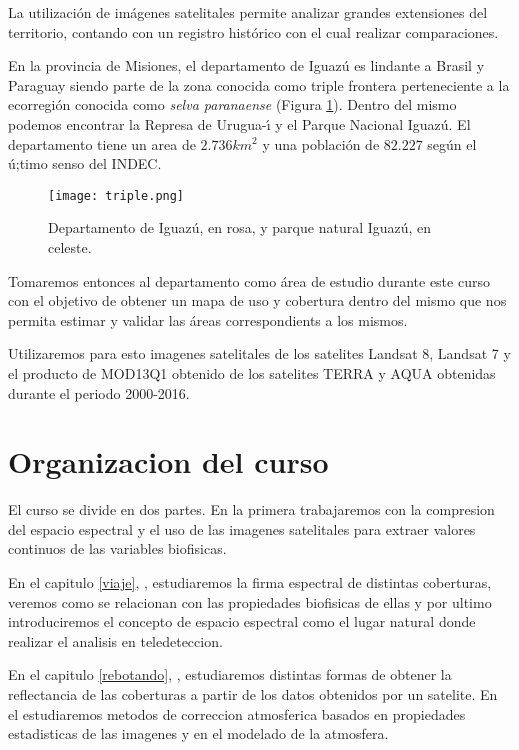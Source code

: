 \label{sec:intro}

La utilización de imágenes satelitales permite analizar grandes extensiones del
territorio, contando con un registro histórico con el cual realizar
comparaciones.

En la provincia de Misiones, el departamento de Iguaz\'u es lindante a Brasil y
Paraguay siendo parte de la zona conocida como triple frontera
perteneciente a la ecorregi\'on conocida como \emph{selva paranaense} (Figura \ref{parque}). Dentro
del mismo podemos encontrar la Represa de Urugua-\'{\i} y el Parque Nacional
Iguaz\'u. El departamento tiene un area de $2.736 km^2$ y una poblaci\'on de
$82.227$ seg\'un el \'u;timo senso del INDEC.

\begin{figure}[h!]
  \centering
  \texttt{[image: triple.png]}
  \caption{Departamento de Iguaz\'u, en rosa, y parque natural Iguaz\'u, en celeste.}
  \label{parque}
\end{figure}

Tomaremos entonces al departamento como \'area de estudio durante este curso
con el objetivo de obtener un mapa de uso y cobertura dentro del mismo que nos
permita estimar y validar  las \'areas correspondients a los mismos.

Utilizaremos para esto imagenes satelitales de los satelites Landsat 8, Landsat 7 y
el producto de MOD13Q1 obtenido de los satelites TERRA y AQUA obtenidas durante
el periodo 2000-2016.

\section{Organizacion del curso}

El curso se divide en dos partes. En la primera trabajaremos con la compresion
del espacio espectral y el uso de las imagenes satelitales para extraer valores
continuos de las variables biofisicas.

En el capitulo \ref{viaje}, , estudiaremos la firma espectral de
distintas coberturas, veremos como se relacionan con las propiedades biofisicas
de ellas y por ultimo introduciremos el concepto de espacio espectral como el
lugar natural donde realizar el analisis en teledeteccion.

En el capitulo \ref{rebotando}, , estudiaremos distintas
formas de obtener la reflectancia de las coberturas a partir de los datos obtenidos
por un satelite. En el estudiaremos metodos de correccion atmosferica basados
en propiedades estadisticas de las imagenes y en el modelado de la atmosfera.

